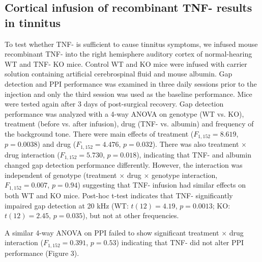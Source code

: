 \subsection{Cortical infusion of recombinant TNF-\textalpha{} results in tinnitus}

To test whether TNF-\textalpha{} is sufficient to cause tinnitus symptoms, we infused mouse recombinant TNF-\textalpha{} into the right hemisphere auditory cortex of normal-hearing WT and TNF-\textalpha{} KO mice. Control WT and KO mice were infused with carrier solution containing artificial cerebrospinal fluid and mouse albumin. Gap detection and PPI performance was examined in three daily sessions prior to the injection and only the third session was used as the baseline performance. Mice were tested again after 3 days of post-surgical recovery. Gap detection performance was analyzed with a 4-way ANOVA on genotype (WT vs. KO), treatment (before vs. after infusion), drug (TNF-\textalpha{} vs. albumin) and frequency of the background tone. There were main effects of treatment ($F_{1,152}=8.619$, $p=0.0038$) and drug ($F_{1,152}=4.476$, $p=0.032$). There was also treatment $\times$ drug interaction ($F_{1,152}=5.730$, $p=0.018$), indicating that TNF-\textalpha{} and albumin changed gap detection performance differently. However, the interaction was independent of genotype (treatment $\times$ drug $\times$ genotype interaction, $F_{1,152}=0.007$, $p=0.94$) suggesting that TNF-\textalpha{} infusion had similar effects on both WT and KO mice. Post-hoc t-test indicates that TNF-\textalpha{} significantly impaired gap detection at 20 kHz (WT: $t(12)=4.19$, $p=0.0013$; KO: $t(12)=2.45$, $p=0.035$), but not at other frequencies.

A similar 4-way ANOVA on PPI failed to show significant treatment $\times$ drug interaction ($F_{1,152}=0.391$, $p=0.53$) indicating that TNF-\textalpha{} did not alter PPI performance (Figure 3).

